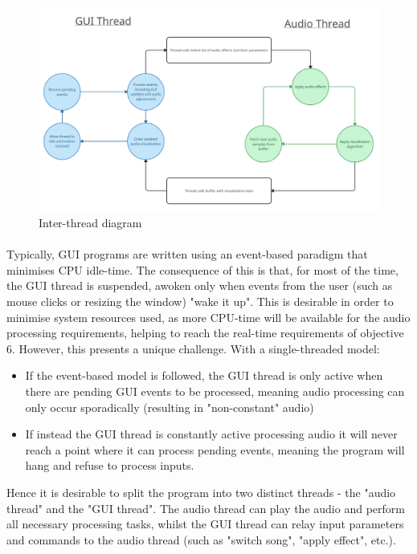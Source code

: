 \begin{figure}[h]
	\includegraphics[width=17cm]{threading}
	\caption{Inter-thread diagram}
\end{figure}

\paragraph{}
Typically, GUI programs are written using an event-based paradigm that minimises CPU idle-time. The consequence of this is that, for most of the time, the GUI thread is suspended, awoken only when events from the user (such as mouse clicks or resizing the window) "wake it up". This is desirable in order to minimise system resources used, as more CPU-time will be available for the audio processing requirements, helping to reach the real-time requirements of objective 6. However, this presents a unique challenge. With a single-threaded model:
\begin{itemize}
	\item If the event-based model is followed, the GUI thread is only active when there are pending GUI events to be processed, meaning audio processing can only occur sporadically (resulting in "non-constant" audio)
	\item If instead the GUI thread is constantly active processing audio it will never reach a point where it can process pending events, meaning the program will hang and refuse to process inputs.
\end{itemize}

Hence it is desirable to split the program into two distinct threads - the "audio thread" and the "GUI thread". The audio thread can play the audio and perform all necessary processing tasks, whilst the GUI thread can relay input parameters and commands to the audio thread (such as "switch song", "apply effect", etc.).

